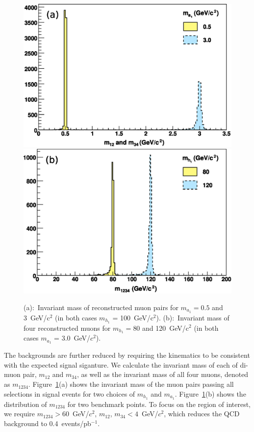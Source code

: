 \documentclass[aps,prl,twocolumn,nofootinbib,superscriptaddress]{revtex4}
\begin{document}
\begin{figure}[htb]
\begin{center}
\includegraphics[width=0.48\linewidth]{muon_pair_masses_new}
\hfill
\includegraphics[width=0.48\linewidth]{fourmuon_invariant_mass_new}

\caption{(a):~Invariant mass of reconstructed muon pairs for $m_{a_1}
  = 0.5$ and 3~GeV/c$^2$ (in both cases $m_{h_1}$ = 100~GeV/c$^2$).
  (b):~Invariant mass of four reconstructed muons for $m_{h_1} = 80$ and
  120~GeV/c$^2$ (in both cases $m_{a_1}$ = 3.0~GeV/$c^2$).}
\label{muon_pairs_masses_invariant_mass}
\end{center}
\end{figure}

The backgrounds are further reduced by requiring the kinematics to be
consistent with the expected signal siganture.  We calculate the
invariant mass of each of di-muon pair, $m_{12}$ and $m_{34}$, as well
as the invariant mass of all four muons, denoted as
$m_{1234}$. Figure~\ref{muon_pairs_masses_invariant_mass}(a) shows the
invariant mass of the muon pairs passing all selections in signal
events for two choices of $m_{h_1}$ and
$m_{a_1}$. Figure~\ref{muon_pairs_masses_invariant_mass}(b) shows the
distribution of $m_{1234}$ for two benchmark points.  To focus on the
region of interest, we require $m_{1234} > 60$~GeV/$c^2$, $m_{12}$,
$m_{34} < 4$~GeV/$c^2$, which reduces the QCD background to
0.4~events/pb$^{-1}$.
\end{document}
